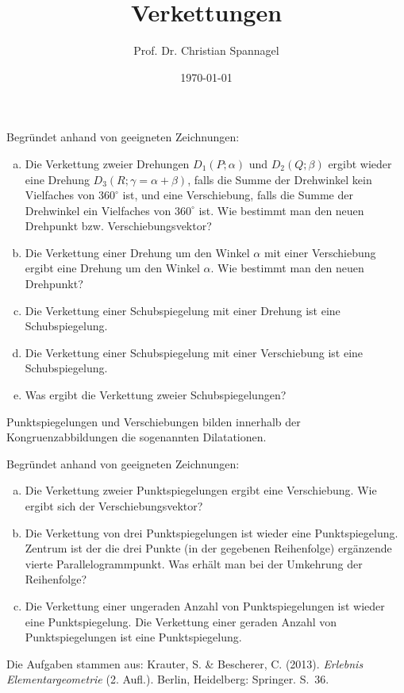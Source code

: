 \documentclass{cssheet}
\title{Verkettungen}
\author{Prof. Dr. Christian Spannagel}
\date{\today}
\begin{document}
\printtitle

\begin{aufgabe}

Begründet anhand von geeigneten Zeichnungen: 
\begin{enumerate}[a)]
\item Die Verkettung zweier Drehungen $D_{1}(P;\alpha)$ und $D_{2}(Q;\beta)$ ergibt wieder eine Drehung $D_{3}(R;\gamma=\alpha+\beta)$, falls die Summe der Drehwinkel kein Vielfaches von $360^{\circ}$ ist, und eine Verschiebung, falls die Summe der Drehwinkel ein Vielfaches von $360^{\circ}$ ist. Wie bestimmt man den neuen Drehpunkt bzw. Verschiebungsvektor?
\item Die Verkettung einer Drehung um den Winkel $\alpha$ mit einer Verschiebung ergibt eine Drehung um den Winkel $\alpha$. Wie bestimmt man den neuen Drehpunkt?
\item Die Verkettung einer Schubspiegelung mit einer Drehung ist eine Schubspiegelung.
\item Die Verkettung einer Schubspiegelung mit einer Verschiebung ist eine Schubspiegelung.
\item Was ergibt die Verkettung zweier Schubspiegelungen?

\end{enumerate}
\end{aufgabe}

\begin{aufgabe}[Dilatationen]

Punktspiegelungen und Verschiebungen bilden innerhalb der Kongruenzabbildungen die sogenannten Dilatationen.

Begründet anhand von geeigneten Zeichnungen: 
\begin{enumerate}[a)]
	\item Die Verkettung zweier Punktspiegelungen ergibt eine Verschiebung. Wie ergibt sich der Verschiebungsvektor?
	\item Die Verkettung von drei Punktspiegelungen ist wieder eine Punktspiegelung. Zentrum ist der die drei Punkte (in der gegebenen Reihenfolge) ergänzende vierte Parallelogrammpunkt. Was erhält man bei der Umkehrung der Reihenfolge?
	\item Die Verkettung einer ungeraden Anzahl von Punktspiegelungen ist wieder eine Punktspiegelung. Die Verkettung einer geraden Anzahl von Punktspiegelungen ist eine Punktspiegelung.
\end{enumerate}
\end{aufgabe}

Die Aufgaben stammen aus: Krauter, S. \& Bescherer, C. (2013). \emph{Erlebnis Elementargeometrie} (2. Aufl.). Berlin, Heidelberg: Springer. S.~36.

\vspace*{10mm}

\printlicense

\printsocials
\end{document}
